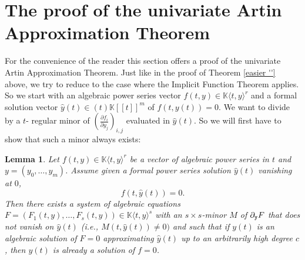 \documentclass[10pt, a4paper]{article}
\def\wh{\widehat}
\newtheorem{lemma}{Lemma}[section]
\theoremstyle{remark}
\theoremstyle{remark}
\begin{document}
\section{The proof of the univariate Artin Approximation Theorem}\label{artin section}
For the convenience of the reader this section offers a proof of the  univariate Artin Approximation Theorem. Just like in the proof of Theorem \ref{easier ''} above, we try to reduce to the case where the Implicit Function Theorem applies. So we start with an algebraic power series vector $f(t,y)\in\mathbb{K}\langle t,y\rangle^r$ and a formal solution vector $\wh{y}(t)\in(t)\mathbb{K}[[t]]^m$ of $f(t,y(t))=0$. We want to divide by a $t$- regular minor of $\left(\frac{\partial f_i}{\partial y_j}\right)_{i,j}$ evaluated in $\wh{y}(t)$. So we will first have to show that such a minor always exists: 
\begin{lemma}\label{Reduction}
    Let $f(t, y)\in \mathbb{K}\langle t,y\rangle ^r$ be a vector of algebraic power series in $t$ and $y=(y_0,\ldots,y_m)$. Assume given a formal power series solution $\widehat{y}(t)$ vanishing at $0$,$$f(t,\widehat{y}(t))=0.$$
    Then there exists a system of algebraic equations $F=(F_1(t,y),\ldots,F_s(t,y))\in\mathbb{K}\langle t,y\rangle^s$ with an $s\times s$-minor $M$ of $\partial_{\tt{y}} F$ that does not vanish on $\wh{y}(t)$ (i.e., $M(t,\wh{y}(t))\neq 0)$ and such that if $y(t)$ is an algebraic solution of $F=0$ approximating $\wh{y}(t)$ up to an arbitrarily high degree $c$, then $y(t)$ is already a solution of $f=0$.
\end{lemma}
\end{document}

